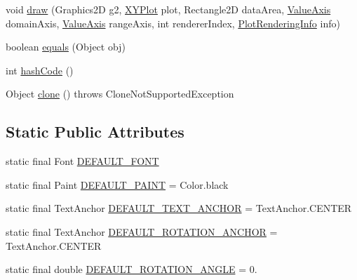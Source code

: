 \begin{DoxyCompactItemize}
void \mbox{\hyperlink{classorg_1_1jfree_1_1chart_1_1annotations_1_1_x_y_text_annotation_a3f5bf9dbc6e083bda0c32dbf7c220646}{draw}} (Graphics2D g2, \mbox{\hyperlink{classorg_1_1jfree_1_1chart_1_1plot_1_1_x_y_plot}{X\+Y\+Plot}} plot, Rectangle2D data\+Area, \mbox{\hyperlink{classorg_1_1jfree_1_1chart_1_1axis_1_1_value_axis}{Value\+Axis}} domain\+Axis, \mbox{\hyperlink{classorg_1_1jfree_1_1chart_1_1axis_1_1_value_axis}{Value\+Axis}} range\+Axis, int renderer\+Index, \mbox{\hyperlink{classorg_1_1jfree_1_1chart_1_1plot_1_1_plot_rendering_info}{Plot\+Rendering\+Info}} info)
\item 
boolean \mbox{\hyperlink{classorg_1_1jfree_1_1chart_1_1annotations_1_1_x_y_text_annotation_ac5ec46e5c9a021db46bb94f209925768}{equals}} (Object obj)
\item 
int \mbox{\hyperlink{classorg_1_1jfree_1_1chart_1_1annotations_1_1_x_y_text_annotation_aa0303063248299081dba25ba9934985d}{hash\+Code}} ()
\item 
Object \mbox{\hyperlink{classorg_1_1jfree_1_1chart_1_1annotations_1_1_x_y_text_annotation_aeeed2b3a6b9f5d426c849e11bba97271}{clone}} ()  throws Clone\+Not\+Supported\+Exception 
\end{DoxyCompactItemize}
\subsection*{Static Public Attributes}
\begin{DoxyCompactItemize}
\item 
static final Font \mbox{\hyperlink{classorg_1_1jfree_1_1chart_1_1annotations_1_1_x_y_text_annotation_ad15b4bd6f07424fcf19f20c1d3dcb405}{D\+E\+F\+A\+U\+L\+T\+\_\+\+F\+O\+NT}}
\item 
static final Paint \mbox{\hyperlink{classorg_1_1jfree_1_1chart_1_1annotations_1_1_x_y_text_annotation_aa9a32d83445e5fbe04516aa404553a84}{D\+E\+F\+A\+U\+L\+T\+\_\+\+P\+A\+I\+NT}} = Color.\+black
\item 
static final Text\+Anchor \mbox{\hyperlink{classorg_1_1jfree_1_1chart_1_1annotations_1_1_x_y_text_annotation_a95f5a2a6172e12fbd1488d640fe0f034}{D\+E\+F\+A\+U\+L\+T\+\_\+\+T\+E\+X\+T\+\_\+\+A\+N\+C\+H\+OR}} = Text\+Anchor.\+C\+E\+N\+T\+ER
\item 
static final Text\+Anchor \mbox{\hyperlink{classorg_1_1jfree_1_1chart_1_1annotations_1_1_x_y_text_annotation_aad451ca32d16f2ca87b8e76bb77fa080}{D\+E\+F\+A\+U\+L\+T\+\_\+\+R\+O\+T\+A\+T\+I\+O\+N\+\_\+\+A\+N\+C\+H\+OR}} = Text\+Anchor.\+C\+E\+N\+T\+ER
\item 
static final double \mbox{\hyperlink{classorg_1_1jfree_1_1chart_1_1annotations_1_1_x_y_text_annotation_abf4712b97e5f45aa1876a1e96fec4021}{D\+E\+F\+A\+U\+L\+T\+\_\+\+R\+O\+T\+A\+T\+I\+O\+N\+\_\+\+A\+N\+G\+LE}} = 0.
\end{DoxyCompactItemize}
